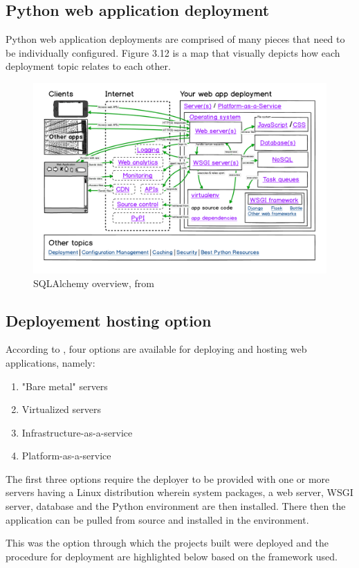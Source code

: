\subsection{Python web application deployment}
Python web application deployments are comprised of many pieces that need to be individually configured. Figure 3.12 is a map that visually depicts how each deployment topic relates to each other.
\begin{figure}[!htbp]
	\centering
	\includegraphics[width=1\textwidth]{./deploy.png}
	\caption{SQLAlchemy overview, from \citet{Makai:2020}}
\end{figure}
\subsection{Deployement hosting option}
According to \citet{Makai:2020}, four options are available for deploying and hosting web applications, namely:
\begin{enumerate}
	\item "Bare metal" servers
	\item Virtualized servers
	\item Infrastructure-as-a-service
	\item Platform-as-a-service
\end{enumerate}
The first three options require the deployer to be provided with one or more servers having a Linux distribution wherein system packages, a web server, \ac{WSGI} server, database and the Python environment are then installed. There then the application can be pulled from source and installed in the environment.

This was the option through which the projects built were deployed and the procedure for deployment are highlighted below based on the framework used.
